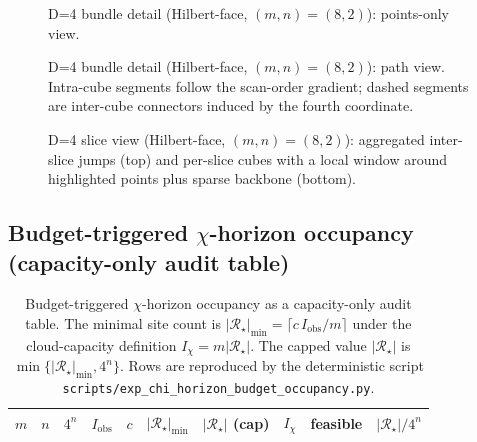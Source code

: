 \begin{figure}[H]
\centering
{}
\caption{D=4 bundle detail (Hilbert-face, $(m,n)=(8,2)$): points-only view.}
\label{fig:detail_bundle_hilbert_m8_n2_points}
\end{figure}

\begin{figure}[H]
\centering
{}
\caption{D=4 bundle detail (Hilbert-face, $(m,n)=(8,2)$): path view. Intra-cube segments follow the scan-order gradient; dashed segments are inter-cube connectors induced by the fourth coordinate.}
\label{fig:detail_bundle_hilbert_m8_n2_path}
\end{figure}

\begin{figure}[H]
\centering
{}
\caption{D=4 slice view (Hilbert-face, $(m,n)=(8,2)$): aggregated inter-slice jumps (top) and per-slice cubes with a local window around highlighted points plus sparse backbone (bottom).}
\label{fig:detail_bundle_hilbert_m8_n2_slice4}
\end{figure}

\subsection{Budget-triggered \texorpdfstring{$\chi$}{chi}-horizon occupancy (capacity-only audit table)}



\begin{table}[H]
\centering
\scriptsize
\setlength{\tabcolsep}{6pt}
\renewcommand{\arraystretch}{1.15}
\begin{tabular}{rrrrrrrrrl}
\toprule
$m$ & $n$ & $4^n$ & $I_{\mathrm{obs}}$ & $c$ & $|{\mathcal R}_\star|_{\min}$ & $|{\mathcal R}_\star|$ (cap) & $I_\chi$ & feasible & $|{\mathcal R}_\star|/4^n$ \\
\midrule
%
\end{tabular}
\caption{Budget-triggered $\chi$-horizon occupancy as a capacity-only audit table. The minimal site count is $|{\mathcal R}_\star|_{\min}=\lceil c\,I_{\mathrm{obs}}/m\rceil$ under the cloud-capacity definition $I_\chi=m|{\mathcal R}_\star|$. The capped value $|{\mathcal R}_\star|$ is $\min\{|{\mathcal R}_\star|_{\min},4^n\}$. Rows are reproduced by the deterministic script \texttt{scripts/exp\_chi\_horizon\_budget\_occupancy.py}.}
\label{tab:chi_horizon_budget_occupancy}
\end{table}

